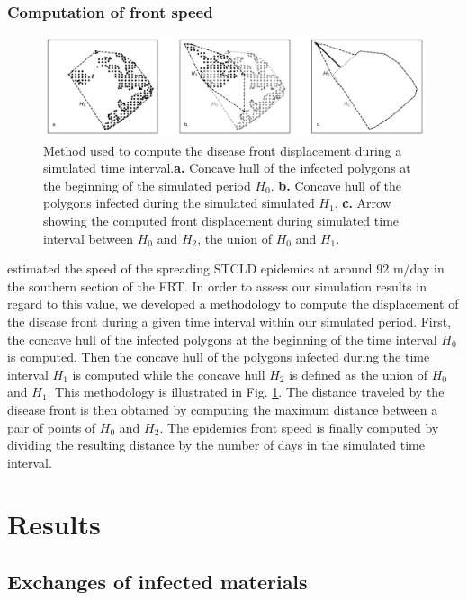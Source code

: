 \documentclass[utf8]{frontiersSCNS}
\begin{document}
\subsubsection{Computation of front speed}

\begin{figure}
    \centering
    \includegraphics[width=.99\linewidth]{figures/hull_example.png}
    \caption{Method used to compute the disease front displacement during a simulated time interval.\textbf{a.} Concave hull of the infected polygons at the beginning of the simulated period $H_0$. \textbf{b.} Concave hull of the polygons infected during the simulated simulated $H_1$. \textbf{c.} Arrow showing the computed front displacement during simulated time interval between $H_0$ and $H_2$, the union of $H_0$ and $H_1$.}
    \label{fig:hull}
\end{figure}

\cite{muller2020spatial} estimated the speed of the spreading STCLD epidemics at around 92 m/day in the southern section of the FRT. In order to assess our simulation results in regard to this value, we developed a methodology to compute the displacement of the disease front during a given time interval within our simulated period. First, the concave hull of the infected polygons at the beginning of the time interval $H_0$ is computed. Then the concave hull of the polygons infected during the time interval $H_1$ is computed while the concave hull $H_2$ is defined as the union of $H_0$ and $H_1$. This methodology is illustrated in Fig. \ref{fig:hull}. The distance traveled by the disease front is then obtained by computing the maximum distance between a pair of points of $H_0$ and $H_2$. The epidemics front speed is finally computed by dividing the resulting distance by the number of days in the simulated time interval.

\section{Results}

\subsection{Exchanges of infected materials}
\end{document}
